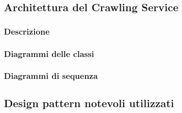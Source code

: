 \subsection{Architettura del Crawling Service}

\subsubsection{Descrizione}

\subsubsection{Diagrammi delle classi}

\subsubsection{Diagrammi di sequenza}

\subsection{Design pattern notevoli utilizzati}